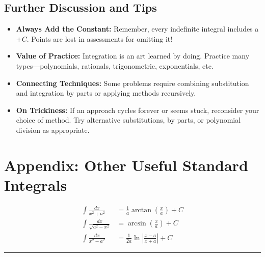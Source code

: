 \documentclass[11pt]{article}
\theoremstyle{definition}
\begin{document}
\subsection{Further Discussion and Tips}

\begin{itemize}
    \item \textbf{Always Add the Constant:} Remember, every indefinite integral includes a $+ C$. Points are lost in assessments for omitting it!
    \item \textbf{Value of Practice:} Integration is an art learned by doing. Practice many types—polynomials, rationals, trigonometric, exponentials, etc.
    \item \textbf{Connecting Techniques:} Some problems require combining substitution and integration by parts or applying methods recursively.
    \item \textbf{On Trickiness:} If an approach cycles forever or seems stuck, reconsider your choice of method. Try alternative substitutions, by parts, or polynomial division as appropriate.
\end{itemize}

\section{Appendix: Other Useful Standard Integrals}

\begin{align*}
    \int \frac{dx}{x^2 + a^2} &= \frac{1}{a} \arctan\left( \frac{x}{a} \right ) + C \\
    \int \frac{dx}{\sqrt{a^2 - x^2}} &= \arcsin \left ( \frac{x}{a} \right ) + C \\
    \int \frac{dx}{x^2 - a^2} &= \frac{1}{2a} \ln \left| \frac{x - a}{x + a} \right | + C
\end{align*}

\bigskip

\hrule
\bigskip
\end{document}
